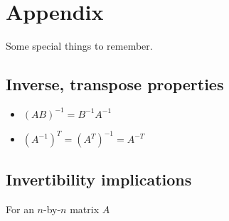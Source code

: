 \documentclass[10pt,letterpaper]{article}
\begin{document}
\section{Appendix}
\label{sec-12}

Some special things to remember.
\subsection{Inverse, transpose properties}
\label{sec-12_1}

\begin{itemize}
\item $(AB) ^{-1} = B ^{-1} A ^{-1}$
\item $(A ^{-1}) ^{T} = (A ^{T}) ^{-1}= A ^{-T}$
\end{itemize}
\subsection{Invertibility implications}
\label{sec-12_2}

For an $n$-by-$n$ matrix $A$ 
\end{document}

